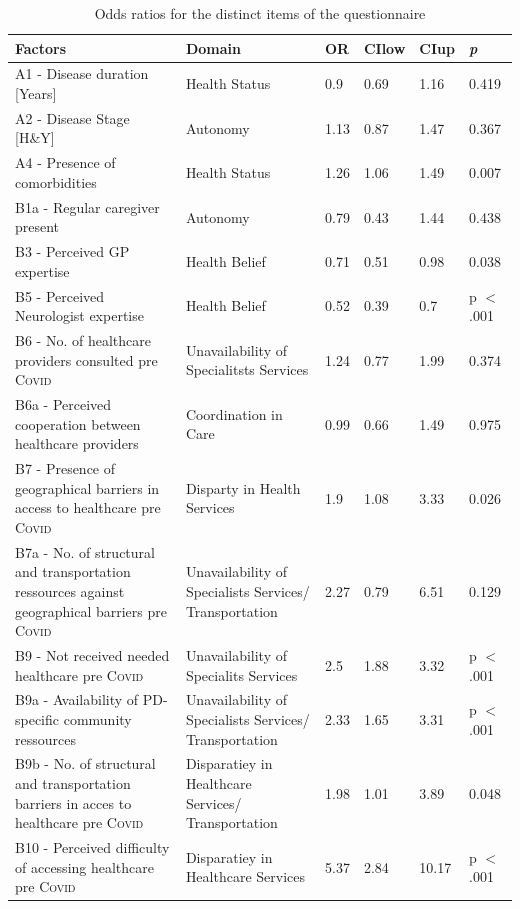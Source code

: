 \documentclass[a4paper,oneside,11pt,english]{scrartcl}
\begin{document}
\newpage
\begin{longtable}[ht!]{|p{5.5cm} | p{3.5cm} | p{1cm} | l | l | p{1.5cm} |}
	\caption{Odds ratios for the distinct items of the questionnaire} 
	\label{tab4:resultsall1} \\ \hline
	\textbf{Factors} & \textbf{Domain} & \textbf{OR} & \textbf{CIlow} & \textbf{CIup} & \textbf{\textit{p}} \\ \hline
	\endhead
	A1 - Disease duration [Years] & Health Status & 0.9 & 0.69 & 1.16 & 0.419 \\ \hline
	A2 - Disease Stage [H\&Y] & Autonomy & 1.13 & 0.87 & 1.47 & 0.367 \\ \hline
	A4 - Presence of comorbidities & Health Status & 1.26 & 1.06 & 1.49 & 0.007 \\ \hline
	B1a - Regular caregiver present & Autonomy & 0.79 & 0.43 & 1.44 & 0.438 \\ \hline
	B3 - Perceived GP expertise & Health Belief & 0.71 & 0.51 & 0.98 & 0.038 \\ \hline
	B5 - Perceived Neurologist expertise & Health Belief & 0.52 & 0.39 & 0.7 & p $<$ .001 \\ \hline
	B6 - No. of healthcare providers consulted pre \textsc{Covid} & Unavailability of Specialitsts Services & 1.24 & 0.77 & 1.99 & 0.374 \\ \hline
	B6a - Perceived cooperation between healthcare providers & Coordination in Care & 0.99 & 0.66 & 1.49 & 0.975 \\ \hline
	B7 - Presence of geographical barriers in access to healthcare pre \textsc{Covid} & Disparty in Health Services & 1.9 & 1.08 & 3.33 & 0.026 \\ \hline
	B7a - No. of structural and transportation ressources against geographical barriers pre \textsc{Covid} & Unavailability of Specialists Services/ Transportation & 2.27 & 0.79 & 6.51 & 0.129 \\ \hline
	B9 - Not received needed healthcare pre \textsc{Covid} & Unavailability of Specialits Services & 2.5 & 1.88 & 3.32 & p $<$ .001 \\ \hline
	B9a - Availability of \textsc{PD}-specific community ressources & Unavailability of Specialists Services/ Transportation & 2.33 & 1.65 & 3.31 & p $<$ .001 \\ \hline
	B9b - No. of structural and transportation barriers in acces to healthcare pre \textsc{Covid} & Disparatiey in Healthcare Services/ Transportation & 1.98 & 1.01 & 3.89 & 0.048 \\ \hline
	B10 - Perceived difficulty of accessing healthcare pre \textsc{Covid} & Disparatiey in Healthcare Services & 5.37 & 2.84 & 10.17 & p $<$ .001 \\ \hline

\end{longtable}
\end{document}
